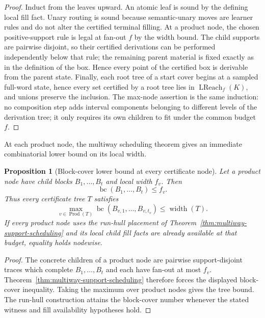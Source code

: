 \documentclass[11pt]{article}
\newtheorem{proposition}[definition]{Proposition}
\begin{document}
\begin{proof}
Induct from the leaves upward.  An atomic leaf is sound by the defining local
fill fact.  Unary routing is sound because semantic-unary moves are learner
rules and do not alter the certified terminal filling.  At a product node, the
chosen positive-support rule is legal at fan-out $f$ by the width bound.  The
child supports are pairwise disjoint, so their certified derivations can be
performed independently below that rule; the remaining parent material is
fixed exactly as in the definition of the box.  Hence every point of the
certified box is derivable from the parent state.  Finally, each root tree of a
start cover begins at a sampled full-word state, hence every set certified by a
root tree lies in $\operatorname{LReach}_f(K)$, and unions preserve the
inclusion.  The max-node assertion is the same induction: no composition step
adds interval components belonging to different levels of the derivation tree;
it only requires its own children to fit under the common budget $f$.
\end{proof}

At each product node, the multiway scheduling theorem gives an immediate
combinatorial lower bound on its local width.

\begin{proposition}[Block-cover lower bound at every certificate node]
\label{prop:tree-node-block-cover}
Let a product node have child blocks $B_1,\ldots,B_t$ and local width $f_v$.
Then
\[
  \boxed{\operatorname{bc}(B_1,\ldots,B_t)\le f_v.}
\]
Thus every certificate tree $T$ satisfies
\[
  \max_{v\in\operatorname{Prod}(T)}
      \operatorname{bc}(B_{v,1},\ldots,B_{v,t_v})
  \le \operatorname{width}(T).
\]
If every product node uses the run-hull placement of
Theorem~\ref{thm:multiway-support-scheduling} and its local child fill facts
are already available at that budget, equality holds nodewise.
\end{proposition}

\begin{proof}
The concrete children of a product node are pairwise support-disjoint traces
which complete $B_1,\ldots,B_t$ and each have fan-out at most $f_v$.
Theorem~\ref{thm:multiway-support-scheduling} therefore forces the displayed
block-cover inequality.  Taking the maximum over product nodes gives the tree
bound.  The run-hull construction attains the block-cover number whenever the
stated witness and fill availability hypotheses hold.
\end{proof}
\end{document}
